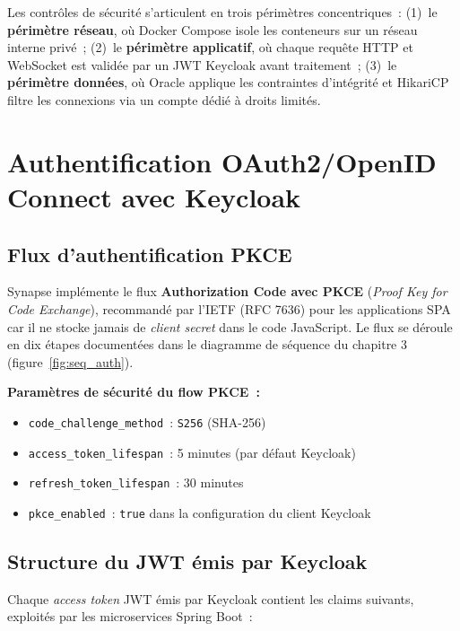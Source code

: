Les contrôles de sécurité s’articulent en trois périmètres concentriques~:
(1)~le \textbf{périmètre réseau}, où Docker Compose isole les conteneurs sur un
réseau interne privé~; (2)~le \textbf{périmètre applicatif}, où chaque requête
HTTP et WebSocket est validée par un JWT Keycloak avant traitement~; (3)~le
\textbf{périmètre données}, où Oracle applique les contraintes d’intégrité et
HikariCP filtre les connexions via un compte dédié à droits limités.

\section{Authentification OAuth2/OpenID Connect avec Keycloak}

\subsection{Flux d’authentification PKCE}

Synapse implémente le flux \textbf{Authorization Code avec PKCE}
(\textit{Proof Key for Code Exchange}), recommandé par l'IETF (RFC 7636) pour les
applications SPA car il ne stocke jamais de \textit{client secret} dans le code
JavaScript. Le flux se déroule en dix étapes documentées dans le diagramme de
séquence du chapitre 3 (figure~\ref{fig:seq_auth}).

\textbf{Paramètres de sécurité du flow PKCE~:}
\begin{itemize}[leftmargin=*,nosep]
  \item \texttt{code\_challenge\_method}~: \texttt{S256} (SHA-256)
  \item \texttt{access\_token\_lifespan}~: 5 minutes (par défaut Keycloak)
  \item \texttt{refresh\_token\_lifespan}~: 30 minutes
  \item \texttt{pkce\_enabled}~: \texttt{true} dans la configuration du client Keycloak
\end{itemize}

\subsection{Structure du JWT émis par Keycloak}

Chaque \textit{access token} JWT émis par Keycloak contient les claims suivants,
exploités par les microservices Spring Boot~:

